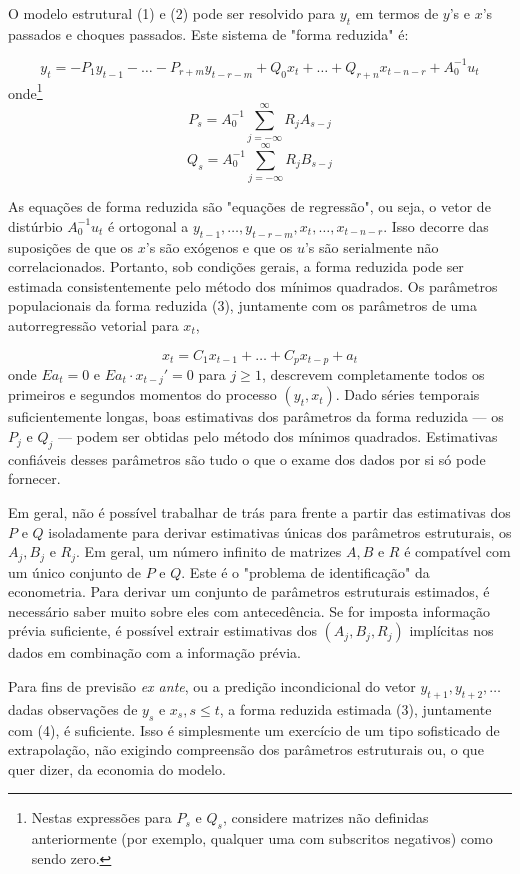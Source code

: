 \documentclass[12pt]{article}
\begin{document}
O modelo estrutural (1) e (2) pode ser resolvido para $y_t$ em termos de $y$'s e $x$'s passados e choques passados. Este sistema de "forma reduzida" é:

\begin{equation}
y_t = - P_1 y_{t-1} - \dots - P_{r+m} y_{t-r-m} + Q_0 x_t + \dots + Q_{r+n} x_{t-n-r} + A_0^{-1} u_t
\end{equation}
onde\footnote{Nestas expressões para $P_s$ e $Q_s$, considere matrizes não definidas anteriormente (por exemplo, qualquer uma com subscritos negativos) como sendo zero.}
\[ P_s = A_0^{-1} \sum_{j=-\infty}^{\infty} R_j A_{s-j} \]
\[ Q_s = A_0^{-1} \sum_{j=-\infty}^{\infty} R_j B_{s-j} \]

As equações de forma reduzida são "equações de regressão", ou seja, o vetor de distúrbio $A_0^{-1} u_t$ é ortogonal a $y_{t-1}, \dots, y_{t-r-m}, x_t, \dots, x_{t-n-r}$. Isso decorre das suposições de que os $x$'s são exógenos e que os $u$'s são serialmente não correlacionados. Portanto, sob condições gerais, a forma reduzida pode ser estimada consistentemente pelo método dos mínimos quadrados. Os parâmetros populacionais da forma reduzida (3), juntamente com os parâmetros de uma autorregressão vetorial para $x_t$,

\begin{equation}
x_t = C_1 x_{t-1} + \dots + C_p x_{t-p} + a_t
\end{equation}
onde $E a_t = 0$ e $E a_t \cdot x_{t-j}' = 0$ para $j \geq 1$, descrevem completamente todos os primeiros e segundos momentos do processo $(y_t, x_t)$. Dado séries temporais suficientemente longas, boas estimativas dos parâmetros da forma reduzida — os $P_j$ e $Q_j$ — podem ser obtidas pelo método dos mínimos quadrados. Estimativas confiáveis desses parâmetros são tudo o que o exame dos dados por si só pode fornecer.

Em geral, não é possível trabalhar de trás para frente a partir das estimativas dos $P$ e $Q$ isoladamente para derivar estimativas únicas dos parâmetros estruturais, os $A_j, B_j$ e $R_j$. Em geral, um número infinito de matrizes $A, B$ e $R$ é compatível com um único conjunto de $P$ e $Q$. Este é o "problema de identificação" da econometria. Para derivar um conjunto de parâmetros estruturais estimados, é necessário saber muito sobre eles com antecedência. Se for imposta informação prévia suficiente, é possível extrair estimativas dos $(A_j, B_j, R_j)$ implícitas nos dados em combinação com a informação prévia.

Para fins de previsão \textit{ex ante}, ou a predição incondicional do vetor $y_{t+1}, y_{t+2}, \dots$ dadas observações de $y_s$ e $x_s, s \leq t$, a forma reduzida estimada (3), juntamente com (4), é suficiente. Isso é simplesmente um exercício de um tipo sofisticado de extrapolação, não exigindo compreensão dos parâmetros estruturais ou, o que quer dizer, da economia do modelo.
\end{document}
